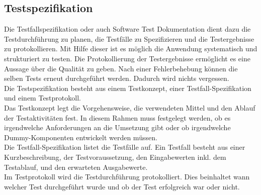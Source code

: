\subsection{Testspezifikation}  \label{Testspezifikation}

Die Testfallspezifikation oder auch Software Test Dokumentation dient dazu die Testdurchführung zu planen, die Testfälle 
zu Spezifizieren und die Testergebnisse zu protokollieren. Mit Hilfe dieser ist es möglich die Anwendung systematisch 
und strukturiert zu testen. Die Protokollierung der Testergebnisse ermöglicht es eine Aussage über die Qualität zu geben.
Nach einer Fehlerbehebung können die selben Tests erneut durchgeführt werden. Dadurch wird nichts vergessen.\\

Die Testspezifikation besteht aus einem Testkonzept, einer Testfall-Spezifikation und einem Testprotokoll.\\
Das Testkonzept legt die Vorgehensweise, die verwendeten Mittel und den Ablauf der Testaktivitäten fest. In diesem Rahmen
muss festgelegt werden, ob es irgendwelche Anforderungen an die Umsetzung gibt oder ob irgendwelche Dummy-Komponenten 
entwickelt werden müssen.\\
Die Testfall-Spezifikation listet die Testfälle auf. Ein Testfall besteht aus einer Kurzbeschreibung, der Testvoraussetzung, 
den Eingabewerten inkl. dem Testablauf, und den erwarteten Ausgabewerte.\\
Im Testprotokoll wird die Testdurchführung protokolliert. Dies beinhaltet wann welcher Test durchgeführt wurde und ob 
der Test erfolgreich war oder nicht.